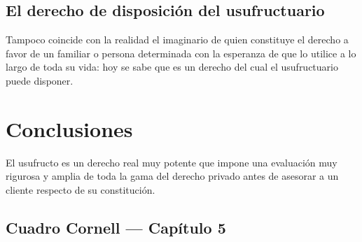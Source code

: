 \documentclass[12pt,oneside]{book}
\begin{document}
\subsection{El derecho de disposición del usufructuario}

Tampoco coincide con la realidad el imaginario de quien constituye el derecho a favor de un familiar o persona determinada con la esperanza de que lo utilice a lo largo de toda su vida: hoy se sabe que es un derecho del cual el usufructuario puede disponer.

\section{Conclusiones}

El usufructo es un derecho real muy potente que impone una evaluación muy rigurosa y amplia de toda la gama del derecho privado antes de asesorar a un cliente respecto de su constitución.

\subsection*{Cuadro Cornell --- Capítulo 5}
\end{document}
